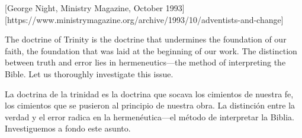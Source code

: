 [George Night, Ministry Magazine, October 1993][https://www.ministrymagazine.org/archive/1993/10/adventists-and-change]


The doctrine of Trinity is the doctrine that undermines the foundation of our faith, the foundation that was laid at the beginning of our work. The distinction between truth and error lies in hermeneutics—the method of interpreting the Bible. Let us thoroughly investigate this issue.


La doctrina de la trinidad es la doctrina que socava los cimientos de nuestra fe, los cimientos que se pusieron al principio de nuestra obra. La distinción entre la verdad y el error radica en la hermenéutica—el método de interpretar la Biblia. Investiguemos a fondo este asunto.






